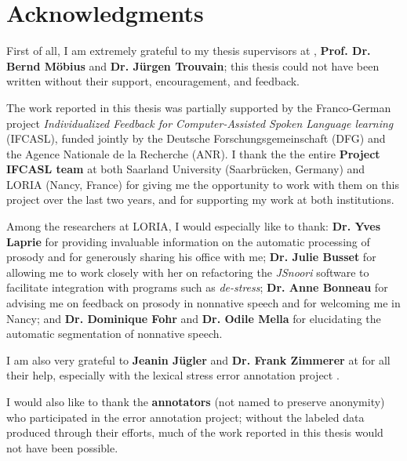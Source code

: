 %
\chapter*{Acknowledgments}
\label{sec:thanks}
\vspace*{-10mm}


First of all, I am extremely grateful to my thesis supervisors at {\thesisUniversity}, \textbf{Prof. Dr. Bernd Möbius} and \textbf{Dr. Jürgen Trouvain}; this thesis could not have been written without their support, encouragement, and feedback.

The work reported in this thesis was partially supported by the Franco-German project \textit{Individualized Feedback for Computer-Assisted Spoken Language learning} (IFCASL), funded jointly by the Deutsche Forschungsgemeinschaft (DFG) and the Agence Nationale de la Recherche (ANR). I thank the the entire \textbf{Project IFCASL team} at both Saarland University (Saarbrücken, Germany) and LORIA (Nancy, France) for giving me the opportunity to work with them on this project over the last two years, and for supporting my work at both institutions.

Among the researchers at LORIA, I would especially like to thank:
\textbf{Dr. Yves Laprie} for providing invaluable information on the automatic processing of prosody and for generously sharing his office with me;
\textbf{Dr. Julie Busset} for allowing me to work closely with her on refactoring the \textit{JSnoori} software to facilitate integration with programs such as \textit{de-stress};
\textbf{Dr. Anne Bonneau} for advising me on feedback on prosody in nonnative speech and for welcoming me in Nancy;
and 
\textbf{Dr. Dominique Fohr} and \textbf{Dr. Odile Mella} for elucidating the automatic segmentation of nonnative speech. 

I am also very grateful to \textbf{Jeanin Jügler} and \textbf{Dr. Frank Zimmerer} at {\thesisUniversity} for all their help, especially with the lexical stress error annotation project . 

I would also like to thank the \textbf{annotators} (not named to preserve anonymity) who participated in the error annotation project; without the labeled data produced through their efforts, much of the work reported in this thesis would not have been possible.

